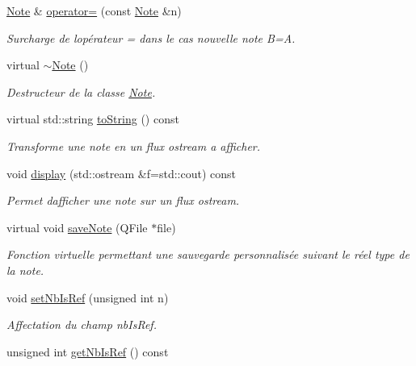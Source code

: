 \begin{DoxyCompactItemize}
\mbox{\label{class_note_ac9b2b6b880bd4c01738ee43bde04b7e5}} 
\hyperlink{class_note}{Note} \& \hyperlink{class_note_ac9b2b6b880bd4c01738ee43bde04b7e5}{operator=} (const \hyperlink{class_note}{Note} \&n)
\begin{DoxyCompactList}\small\item\em Surcharge de l\textquotesingle{}opérateur = dans le cas nouvelle note B=A. \end{DoxyCompactList}\item 
\mbox{\label{class_note_ade484273015c82e7fa59a028de0d8818}} 
virtual \hyperlink{class_note_ade484273015c82e7fa59a028de0d8818}{$\sim$\+Note} ()
\begin{DoxyCompactList}\small\item\em Destructeur de la classe \hyperlink{class_note}{Note}. \end{DoxyCompactList}\item 
virtual std\+::string \hyperlink{class_note_a1bd4acfbde0b71d05fd7d4ca889bca2b}{to\+String} () const
\begin{DoxyCompactList}\small\item\em Transforme une note en un flux ostream a afficher. \end{DoxyCompactList}\item 
void \hyperlink{class_note_a0398c75a4e1516fd8455bd3513151b8b}{display} (std\+::ostream \&f=std\+::cout) const
\begin{DoxyCompactList}\small\item\em Permet d\textquotesingle{}afficher une note sur un flux ostream. \end{DoxyCompactList}\item 
virtual void \hyperlink{class_note_a0c2cc72d7f3235c665a30ef915c5c58d}{save\+Note} (Q\+File $\ast$file)
\begin{DoxyCompactList}\small\item\em Fonction virtuelle permettant une sauvegarde personnalisée suivant le réel type de la note. \end{DoxyCompactList}\item 
void \hyperlink{class_note_abd4e40260ae1c7c621bbd85eea478a06}{set\+Nb\+Is\+Ref} (unsigned int n)
\begin{DoxyCompactList}\small\item\em Affectation du champ nb\+Is\+Ref. \end{DoxyCompactList}\item 
unsigned int \hyperlink{class_note_adc7d55aa12e59b2c67f91bd7f02935d8}{get\+Nb\+Is\+Ref} () const

\end{DoxyCompactItemize}
